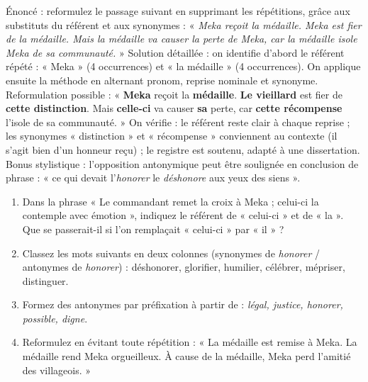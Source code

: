 \documentclass[11pt]{article}
\begin{document}
\begin{exoresolu}
Énoncé : reformulez le passage suivant en supprimant les répétitions, grâce aux substituts du référent et aux synonymes : « \emph{Meka reçoit la médaille. Meka est fier de la médaille. Mais la médaille va causer la perte de Meka, car la médaille isole Meka de sa communauté.} »
\tcblower
Solution détaillée : on identifie d'abord le référent répété : « Meka » (4 occurrences) et « la médaille » (4 occurrences). On applique ensuite la méthode en alternant pronom, reprise nominale et synonyme. Reformulation possible : « \textbf{Meka} reçoit la \textbf{médaille}. \textbf{Le vieillard} est fier de \textbf{cette distinction}. Mais \textbf{celle-ci} va causer \textbf{sa} perte, car \textbf{cette récompense} l'isole de sa communauté. » On vérifie : le référent reste clair à chaque reprise ; les synonymes « distinction » et « récompense » conviennent au contexte (il s'agit bien d'un honneur reçu) ; le registre est soutenu, adapté à une dissertation. Bonus stylistique : l'opposition antonymique peut être soulignée en conclusion de phrase : « ce qui devait l'\emph{honorer} le \emph{déshonore} aux yeux des siens ».
\end{exoresolu}

\begin{exercice}
\begin{enumerate}
\item Dans la phrase « Le commandant remet la croix à Meka ; celui-ci la contemple avec émotion », indiquez le référent de « celui-ci » et de « la ». Que se passerait-il si l'on remplaçait « celui-ci » par « il » ?
\item Classez les mots suivants en deux colonnes (synonymes de \emph{honorer} / antonymes de \emph{honorer}) : déshonorer, glorifier, humilier, célébrer, mépriser, distinguer.
\item Formez des antonymes par préfixation à partir de : \emph{légal, justice, honorer, possible, digne}.
\item Reformulez en évitant toute répétition : « La médaille est remise à Meka. La médaille rend Meka orgueilleux. À cause de la médaille, Meka perd l'amitié des villageois. »
\end{enumerate}
\end{exercice}
\end{document}
